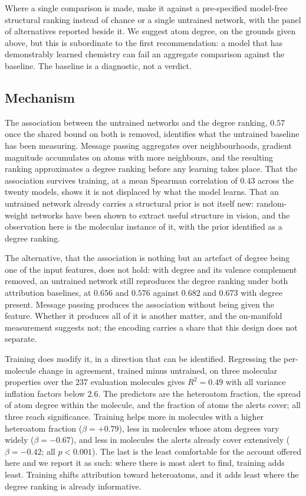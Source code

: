 \documentclass[journal=jcisd8,manuscript=article]{achemso}
\begin{document}
Where a single comparison is made, make it against a pre-specified model-free structural
ranking instead of chance or a single untrained network, with the panel of alternatives
reported beside it. We suggest atom degree, on the grounds given above, but this is
subordinate to the first recommendation: a model that has demonstrably learned chemistry can
fail an aggregate comparison against the baseline. The baseline is a diagnostic, not a
verdict.

\subsection{Mechanism}

The association between the untrained networks and the degree ranking, $0.57$ once the
shared bound on both is removed, identifies what the untrained baseline has been measuring. Message
passing aggregates over neighbourhoods, gradient magnitude accumulates on atoms with more
neighbours, and the resulting ranking approximates a degree ranking before any learning takes
place. That the association survives training, at a mean Spearman correlation of $0.43$
across the twenty models, shows it is not displaced by what the model learns. That an
untrained network already carries a structural prior is not itself new: random-weight
networks have been shown to extract useful structure in vision,\cite{saxe2011} and the
observation here is the molecular instance of it, with the prior identified as a degree
ranking.

The alternative, that the association is nothing but an artefact of degree being one of the
input features, does not hold: with degree and its valence complement removed, an untrained
network still reproduces the degree ranking under both attribution baselines, at $0.656$ and $0.576$ against $0.682$ and $0.673$ with degree present. Message passing produces the association without
being given the feature. Whether it produces all of it is another matter, and the on-manifold
measurement suggests not; the encoding carries a share that this design does not separate.

Training does modify it, in a direction that can be identified. Regressing the per-molecule change in agreement, trained minus untrained, on three molecular
properties over the 237 evaluation molecules gives $R^2 = 0.49$ with all variance inflation
factors below $2.6$. The predictors are the heteroatom fraction, the spread of atom degree
within the molecule, and the fraction of atoms the alerts cover; all three reach
significance. Training helps more in molecules
with a higher heteroatom fraction ($\beta = +0.79$), less in molecules whose atom degrees vary
widely ($\beta = -0.67$), and less in molecules the alerts already cover extensively
($\beta = -0.42$; all $p < 0.001$). The last is the least comfortable for the account offered
here and we report it as such: where there is most alert to find, training adds least. Training shifts attribution toward
heteroatoms, and it adds least where the degree ranking is already informative.
\end{document}
